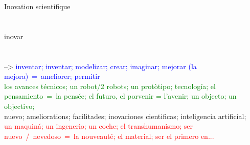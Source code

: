 \documentclass[12pt,a4paper]{article}
\begin{document}
Inovation scientifique\\
\\ \\ 


inovar \\ \\ \\

-->\textcolor{blue}{ inventar; inventar; modelizar; crear; imaginar; mejorar (la mejora)~=~ameliorer; permitir} 
\\ 
\textcolor{green}{ 
los avances t\'ecnicos; un robot/2 robots; un prot\`otipo; tecnolog\'ia; el pensamiento~=~la pens\'ee; el futuro, el porvenir = l'avenir; un objecto; un objectivo;}\\
nuevo; ameliorations; facilitades; inovaciones cientificas; inteligencia artificial;
\\
\textcolor{red}{un maquin\'a; un ingenerio; un coche; el transhumanismo; ser nuevo~/~nevedoso~=~la nouveaut\'e; el material; ser el primero en... }
\\
\end{document}
